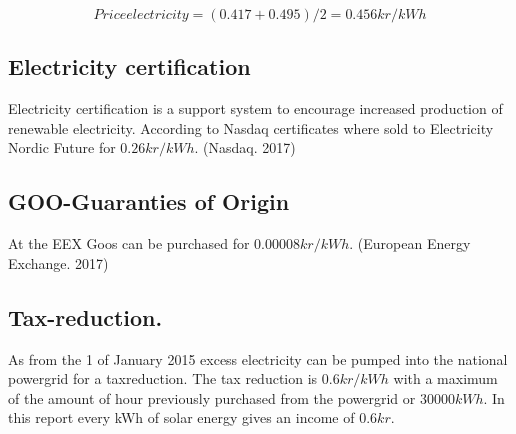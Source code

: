\documentclass{report}
\newcommand{\mysubpart}[1]{\subsection*{#1}}
\begin{document}
\begin{equation}
Price electricity = ( 0.417  + 0.495)/2 = 0.456 kr/kWh
\end{equation}

\mysubpart{Electricity certification}
Electricity certification is a support system to encourage increased production of renewable electricity. According to Nasdaq certificates where sold to Electricity Nordic Future for $ 0.26 kr/kWh$. (Nasdaq. 2017)

\mysubpart{GOO-Guaranties of Origin}
At the EEX Goos can be purchased for $ 0.00008 kr/kWh $. (European Energy Exchange. 2017)


\mysubpart{Tax-reduction.}
As from the 1 of January 2015 excess electricity can be pumped into the national powergrid for a taxreduction. The tax reduction is $ 0.6 kr/kWh $ with a maximum of the amount of hour previously purchased from the powergrid or $ 30 000 kWh $. In this report every kWh of solar energy gives an income of $ 0.6 kr $. 
\end{document}
